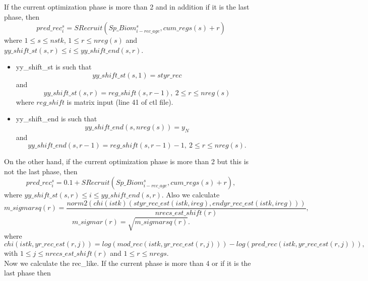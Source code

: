 \documentclass{article}
\begin{document}
If the current optimization phase is more than 2 and in addition if it is the last phase, then
\begin{equation}
    pred\_rec_{i}^s=SRecruit(Sp\_Biom^s_{i-rec\_age},cum\_regs(s)+r)
\end{equation}
where $1\leq s \leq nstk$, $1\leq r \leq nreg(s)$ and $yy\_shift\_st(s,r)\leq i \leq yy\_shift\_end(s,r)$.\\
\begin{itemize}
    \item yy\_shift\_st is such that $$yy\_shift\_st(s,1)=styr\_rec$$
    and
    \begin{equation*}
         yy\_shift\_st(s,r) = reg\_shift(s,r-1), \ 2\leq r \leq nreg(s)
    \end{equation*}
    where $reg\_shift$ is matrix input (line 41 of ctl file).
    \item yy\_shift\_end is such that
    \begin{equation*}
        yy\_shift\_end(s,nreg(s))= y_N
    \end{equation*}
    and
    \begin{equation*}
        yy\_shift\_end(s,r-1)=reg\_shift(s,r-1)-1, \ 2 \leq r \leq nreg(s).
    \end{equation*}
\end{itemize}

On the other hand, if the current optimization phase is more than 2 but this is not the last phase, then
\begin{equation}
    pred\_rec^s_i = 0.1+SRecruit(Sp\_Biom^s_{i-rec\_age},cum\_regs(s)+r),
\end{equation}
where $yy\_shift\_st(s,r)\leq i \leq yy\_shift\_end(s,r)$.
Also we calculate
\begin{equation}
    m\_sigmarsq(r)=\dfrac{norm2( chi(istk)(styr\_rec\_est(istk,ireg),endyr\_rec\_est(istk,ireg)) )}{nrecs\_est\_shift(r)},
\end{equation}
\begin{equation}
    m\_sigmar(r)=\sqrt{m\_sigmarsq(r)}.
\end{equation}
where 
\begin{equation}
    chi(istk,yr\_rec\_est(r,j)) = log(mod\_rec(istk,yr\_rec\_est(r,j))) - log(pred\_rec(istk,yr\_rec\_est(r,j))),
\end{equation}
with $1\leq j \leq nrecs\_est\_shift(r)$ and $1\leq r \leq nregs.$\\

Now we calculate the rec\_like. If the current phase is more than 4 or if it is the last phase then
\end{document}
